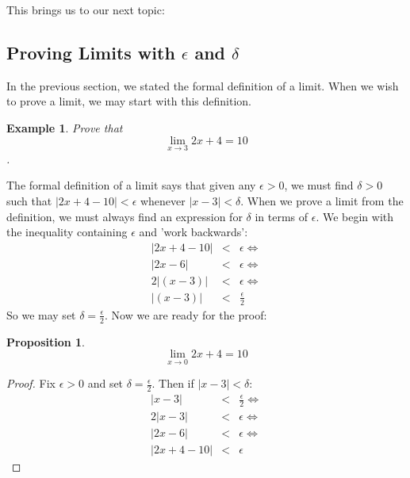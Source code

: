 \documentclass[12pt,a4paper]{article} %
\newtheorem{example}{Example}
\newtheorem{prop}{Proposition}
\begin{document}
This brings us to our next topic:

\subsection{Proving Limits with $\epsilon$ and $\delta$}

In the previous section, we stated the formal definition of a limit.  When we wish to prove a limit, we may start with this definition.
\begin{example}
Prove that $$\lim_{x\rightarrow 3} 2x +4 =10$$.\\
\end{example}
The formal definition of a limit says that given any $\epsilon>0$, we must find $\delta>0$ such that $|2x+4 -10|<\epsilon$ whenever $|x-3|<\delta$.  When we prove a limit from the definition, we must always find an expression for $\delta$ in terms of $\epsilon$.  We begin with the inequality containing $\epsilon$ and 'work backwards':
\begin{eqnarray*}
|2x+4-10| &<& \epsilon \iff \\
|2x-6|&<& \epsilon \iff \\
2|(x-3)|&<&\epsilon \iff\\
|(x-3)|&<&\frac{\epsilon}2
\end{eqnarray*}
So we may set $\delta = \frac{\epsilon}{2}$.  Now we are ready for the proof:
\begin{prop}
$$\lim_{x\rightarrow 0} 2x + 4 =10$$
\end{prop}
\begin{proof}
Fix $\epsilon>0$ and set $\delta = \frac{\epsilon}{2}$.  Then if $|x-3|<\delta$:
\begin{eqnarray*}
|x-3|&<&\frac{\epsilon}{2}\iff\\
2|x-3|&<&\epsilon\iff\\
|2x -6|&<&\epsilon\iff\\
|2x +4 -10|&<&\epsilon
\end{eqnarray*}
\end{proof}
\end{document}
